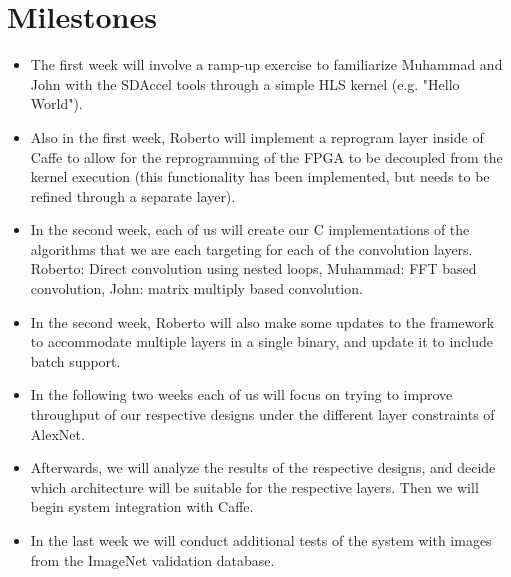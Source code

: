 \documentclass[conference,compsoc]{IEEEtran/IEEEtran}
\begin{document}
\section{Milestones}\label{section:milestones}
\begin{itemize}
    \item The first week will involve a ramp-up exercise to familiarize Muhammad and John with 
	the SDAccel tools through a simple HLS kernel (e.g. "Hello World"). 
    \item Also in the first week, Roberto will implement a reprogram layer inside of Caffe to 
	allow for the reprogramming of the FPGA to be decoupled from the kernel execution 
	(this functionality has been implemented, but needs to be refined through a separate layer). 
    \item In the second week, each of us will create our C implementations of the algorithms 
	that we are each targeting for each of the convolution layers. Roberto: Direct convolution 
	using nested loops, Muhammad: FFT based convolution, John: matrix multiply based convolution. 
	\item In the second week, Roberto will also make some updates to the framework to accommodate
	multiple layers in a single binary, and update it to include batch support. 
    \item In the following two weeks each of us will focus on trying to improve throughput of our 
	respective designs under the different layer constraints of AlexNet.
    \item Afterwards, we will analyze the results of the respective designs, and decide which 
	architecture will be suitable for the respective layers. Then we will begin system integration 
	with Caffe.
    \item In the last week we will conduct additional tests of the system with images from the 
	ImageNet validation database. 
\end{itemize}




\end{document}
